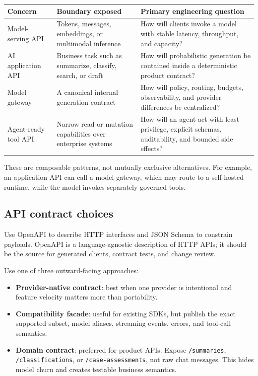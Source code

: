 \documentclass[10pt]{article}
\newcommand{\code}[1]{\texttt{#1}}
\begin{document}
\begin{tabularx}{\textwidth}{P{0.19\textwidth} Y Y}
\toprule
\textbf{Concern} & \textbf{Boundary exposed} & \textbf{Primary engineering question} \\
\midrule
Model-serving API & Tokens, messages, embeddings, or multimodal inference & How will clients invoke a model with stable latency, throughput, and capacity? \\
AI application API & Business task such as summarize, classify, search, or draft & How will probabilistic generation be contained inside a deterministic product contract? \\
Model gateway & A canonical internal generation contract & How will policy, routing, budgets, observability, and provider differences be centralized? \\
Agent-ready tool API & Narrow read or mutation capabilities over enterprise systems & How will an agent act with least privilege, explicit schemas, auditability, and bounded side effects? \\
\bottomrule
\end{tabularx}

These are composable patterns, not mutually exclusive alternatives. For example, an application API can call a model gateway, which may route to a self-hosted runtime, while the model invokes separately governed tools.

\subsection{API contract choices}

Use OpenAPI to describe HTTP interfaces and JSON Schema to constrain payloads. OpenAPI is a language-agnostic description of HTTP APIs; it should be the source for generated clients, contract tests, and change review.\cite{openapi}

Use one of three outward-facing approaches:

\begin{itemize}
  \item \textbf{Provider-native contract}: best when one provider is intentional and feature velocity matters more than portability.
  \item \textbf{Compatibility facade}: useful for existing SDKs, but publish the exact supported subset, model aliases, streaming events, errors, and tool-call semantics.
  \item \textbf{Domain contract}: preferred for product APIs. Expose \code{/summaries}, \code{/classifications}, or \code{/case-assessments}, not raw chat messages. This hides model churn and creates testable business semantics.
\end{itemize}
\end{document}
